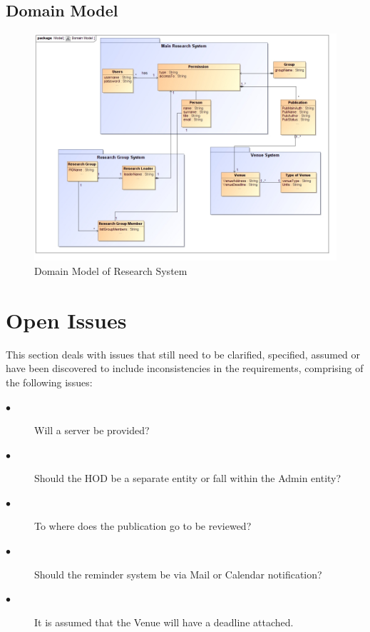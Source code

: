 \documentclass[a4paper]{article}
\begin{document}
	\subsection{Domain Model}
	\begin{figure}[H]
		\includegraphics[width=\textwidth]{DomainModel.jpg}
		\caption{Domain Model of Research System \label{overflow}}
	\end{figure}
	\pagebreak
	\section{Open Issues}
	This section deals with issues that still need to be clarified, specified, assumed or have been discovered to include inconsistencies in the requirements, comprising of the following issues:
	\begin{description}
		\item[$\bullet$] Will a server be provided?
	\end{description}
	\begin{description}
		\item[$\bullet$] Should the HOD be a separate entity or fall within the Admin entity?
	\end{description}
	\begin{description}
	\item[$\bullet$] To where does the publication go to be reviewed?
	\end{description}
	\begin{description}
	\item[$\bullet$] Should the reminder system be via Mail or Calendar notification?
	\end{description}
	\begin{description}
	\item[$\bullet$] It is assumed that the Venue will have a deadline attached.
	\end{description}
		
\end{document}
